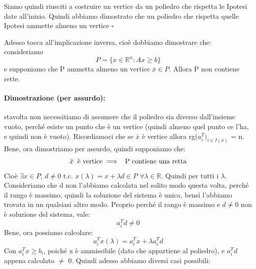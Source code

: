 Siamo quindi riusciti a costruire un vertice da un poliedro che rispetta le Ipotesi date all'inizio. Quindi abbiamo dimostrato che un poliedro che rispetta quelle Ipotesi ammette almeno un vertice $\square$

\vspace{1cm}

\noindent Adesso tocca all'implicazione inversa, cioè dobbiamo dimostrare che: consideriamo
\begin{equation*}
    P = \{x \in \mathbb{R}^n: Ax \geq b\}
\end{equation*}
e supponiamo che P ammetta almeno un vertice $\bar{x} \in P$. Allora P non contiene rette.

\paragraph{Dimostrazione (per assurdo):} stavolta non necessitiamo di assumere che il poliedro sia diverso dall'insieme vuoto, perché esiste un punto che è un vertice (quindi almeno quel punto ce l'ha, e quindi non è vuoto). Ricordiamoci che se $\bar{x}$ è vertice allora rg($a_i^T)_{i \in I(\bar{x})}$ = n. Bene, ora dimostriamo per assurdo, quindi supponiamo che:
\begin{equation*}
    \bar{x} \hspace{0.2cm} \text{è vertice} \implies \hspace{0.2cm} \text{P contiene una retta}
\end{equation*}
Cioè $\exists x \in P$, $d \neq 0$ t.c. $x(\lambda) = x + \lambda d \in P$ $\forall \lambda \in \mathbb{R}$. Quindi per tutti i $\lambda$. Consideriamo che d non l'abbiamo calcolata nel solito modo questa volta, perché il rango è massimo, quindi la soluzione del sistema è unica, bensì l'abbiamo trovata in un qualsiasi altro modo. Proprio perché il rango è massimo e $d \neq 0$ non è soluzione del sistema, vale:
\begin{equation*}
    a_i^Td \neq 0
\end{equation*}
Bene, ora possiamo calcolare:
\begin{equation*}
    a_i^Tx(\lambda) = a_i^Tx + \lambda a_i^Td
\end{equation*}
Con $a_i^Tx \geq b_i$, poiché x è ammissibile (dato che appartiene al poliedro), e $a_i^Td$ appena calcolato $\neq$ 0. Quindi adesso abbiamo diversi casi possibili:
